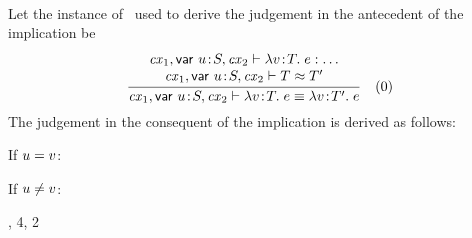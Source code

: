 \begin{bycase}
\Case{\Rthabssbs}\\
Let the instance of \Rthabssbs\ used to derive the judgement in the antecedent
of the implication be
\[
\rruleII
 {\hastyany{\cxv}{\absO}}
 {\teq{\cxv}{\typ}{\typ'}}
 {\theo{\cxv}{\eq{\absO}{\abs{\var}{\typ'}{\expr}}}}
 {0}
\]
The judgement in the consequent of the implication is derived as follows:
\begin{derivation}
\end{derivation}
If $u=v$:
\begin{derivatioN}{2}
\end{derivatioN}
If $u\neq v$:
\begin{derivatioN}{2}
     {\Rthabssbs, 4, 2}
\end{derivatioN}


\end{bycase}

